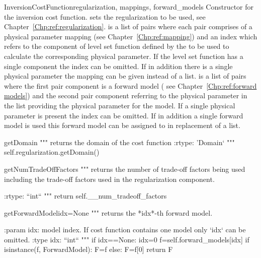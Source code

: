 \begin{classdesc}{InversionCostFunction}{regularization, mappings, forward_models}
Constructor for the inversion cost function.  sets the regularization to be used, see Chapter~\ref{Chp:ref:regularization}.
 is a list of pairs where each pair comprises of a 
physical parameter mapping (see Chapter~\ref{Chp:ref:mapping}) and an index which refers to the component of level set function
defined by the  to be used to calculate the corresponding physical parameter. If 
the level set function has a single component the index can be omitted. If in addition there is a single physical parameter
the mapping can be given instead of a list.  is a list of pairs where the 
first pair component is a forward model ( see Chapter~\ref{Chp:ref:forward models}) and the second 
pair component referring to the physical parameter in the  list providing the  physical parameter for the model.
If a single physical parameter is present the index can be omitted. If in addition a single  forward model is used this
forward model can be assigned to  in replacement of a list.
\end{classdesc}


\begin{methoddesc}[InversionCostFunction]{getDomain}{}
        """
        returns the domain of the cost function
        :rtype: 'Domain`
        """
        self.regularization.getDomain()
\end{methoddesc}
        
\begin{methoddesc}[InversionCostFunction]{getNumTradeOffFactors}{}
        """
        returns the number of trade-off factors being used including the
        trade-off factors used in the regularization component.

        :rtype: ``int``
        """
        return self.__num_tradeoff_factors
\end{methoddesc}

 \begin{methoddesc}[InversionCostFunction]{getForwardModel}{idx=None}
        """
        returns the *idx*-th forward model.

        :param idx: model index. If cost function contains one model only `idx`
                    can be omitted.
        :type idx: ``int``
        """
        if idx==None: idx=0
        f=self.forward_models[idx]
        if isinstance(f, ForwardModel): 
              F=f
        else:
              F=f[0]
        return F
\end{methoddesc}
        
